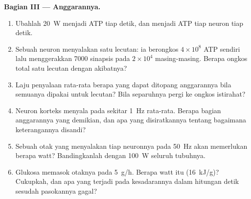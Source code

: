 \begin{problem}
\medskip
\noindent\textbf{Bagian III --- Anggarannya.}
\begin{enumerate}[resume]
  \item Ubahlah \qty{20}{W} menjadi ATP tiap detik, dan menjadi ATP tiap neuron
        tiap detik.
  \item Sebuah neuron menyalakan satu lecutan: ia berongkos $4\times 10^{8}$ ATP
        sendiri lalu menggerakkan \num{7000} sinapsis pada $2\times 10^{4}$ masing-masing.
        Berapa ongkos total satu lecutan dengan akibatnya?
  \item Laju penyalaan rata-rata berapa yang dapat ditopang anggarannya bila
        semuanya dipakai untuk lecutan? Bila separuhnya pergi ke ongkos istirahat?
  \item Neuron korteks menyala pada sekitar \qty{1}{Hz} rata-rata. Berapa
        bagian anggarannya yang demikian, dan apa yang disiratkannya tentang
        bagaimana keterangannya disandi?
  \item Sebuah otak yang menyalakan tiap neuronnya pada \qty{50}{Hz} akan memerlukan
        berapa watt? Bandingkanlah dengan \qty{100}{W} seluruh tubuhnya.
  \item Glukosa memasok otaknya pada \qty{5}{g/h}. Berapa watt itu
        (\qty{16}{kJ/g})? Cukupkah, dan apa yang terjadi pada
        kesadarannya dalam hitungan detik sesudah pasokannya gagal?
\end{enumerate}


\end{problem}

